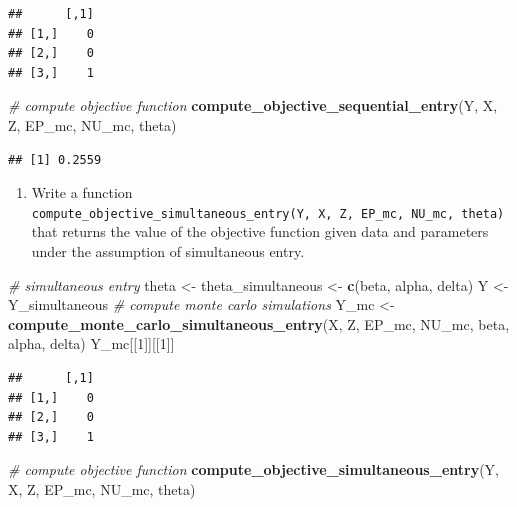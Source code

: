 \documentclass[]{book}
\newenvironment{Shaded}{\begin{snugshade}}{\end{snugshade}}
\newcommand{\KeywordTok}[1]{\textcolor[rgb]{0.13,0.29,0.53}{\textbf{#1}}}
\newcommand{\DecValTok}[1]{\textcolor[rgb]{0.00,0.00,0.81}{#1}}
\newcommand{\StringTok}[1]{\textcolor[rgb]{0.31,0.60,0.02}{#1}}
\newcommand{\CommentTok}[1]{\textcolor[rgb]{0.56,0.35,0.01}{\textit{#1}}}
\newcommand{\NormalTok}[1]{#1}
\providecommand{\tightlist}{%
  \setlength{\itemsep}{0pt}\setlength{\parskip}{0pt}}
\begin{document}
\begin{verbatim}
##      [,1]
## [1,]    0
## [2,]    0
## [3,]    1
\end{verbatim}

\begin{Shaded}
\begin{Highlighting}[]
\CommentTok{# compute objective function}
\KeywordTok{compute_objective_sequential_entry}\NormalTok{(Y, X, Z, EP_mc, NU_mc, theta)}
\end{Highlighting}
\end{Shaded}

\begin{verbatim}
## [1] 0.2559
\end{verbatim}

\begin{enumerate}
\def\labelenumi{\arabic{enumi}.}
\setcounter{enumi}{2}
\tightlist
\item
  Write a function
  \texttt{compute\_objective\_simultaneous\_entry(Y,\ X,\ Z,\ EP\_mc,\ NU\_mc,\ theta)}
  that returns the value of the objective function given data and
  parameters under the assumption of simultaneous entry.
\end{enumerate}

\begin{Shaded}
\begin{Highlighting}[]
\CommentTok{# simultaneous entry}
\NormalTok{theta <-}\StringTok{ }\NormalTok{theta_simultaneous <-}
\StringTok{  }\KeywordTok{c}\NormalTok{(beta, alpha, delta)}
\NormalTok{Y <-}\StringTok{ }\NormalTok{Y_simultaneous}
\CommentTok{# compute monte carlo simulations}
\NormalTok{Y_mc <-}\StringTok{ }\KeywordTok{compute_monte_carlo_simultaneous_entry}\NormalTok{(X, Z, EP_mc, NU_mc, beta, alpha, delta)}
\NormalTok{Y_mc[[}\DecValTok{1}\NormalTok{]][[}\DecValTok{1}\NormalTok{]]}
\end{Highlighting}
\end{Shaded}

\begin{verbatim}
##      [,1]
## [1,]    0
## [2,]    0
## [3,]    1
\end{verbatim}

\begin{Shaded}
\begin{Highlighting}[]
\CommentTok{# compute objective function}
\KeywordTok{compute_objective_simultaneous_entry}\NormalTok{(Y, X, Z, EP_mc, NU_mc, theta)}
\end{Highlighting}
\end{Shaded}
\end{document}
